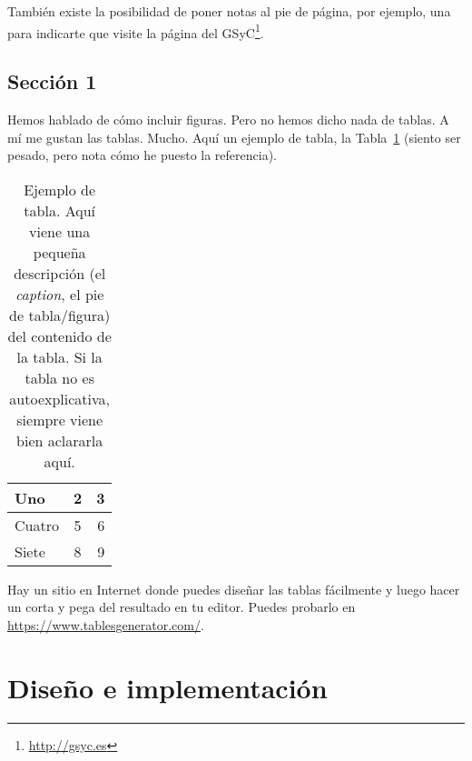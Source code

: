 \documentclass[a4paper, 12pt]{book}
\begin{document}
	También existe la posibilidad de poner notas al pie de página, por ejemplo, una para indicarte que visite la página del GSyC\footnote{\url{http://gsyc.es}}.
	
	
	
	\section{Sección 1} 
	\label{sec:seccion1}
	
	Hemos hablado de cómo incluir figuras.
	Pero no hemos dicho nada de tablas.
	A mí me gustan las tablas.
	Mucho.
	Aquí un ejemplo de tabla, la Tabla~\ref{tab:ejemplo} (siento ser pesado, pero nota cómo he puesto la referencia).
	
	\begin{table}
		\begin{center}
			\begin{tabular}{ | l | c | r |} %
				\hline
				Uno & 2 & 3 \\ \hline %
				Cuatro & 5 & 6 \\ \hline
				Siete & 8 & 9 \\
				\hline
			\end{tabular}
			\caption{Ejemplo de tabla. Aquí viene una pequeña descripción (el \emph{caption}, el pie de tabla/figura) del contenido de la tabla. Si la tabla no es autoexplicativa, siempre viene bien aclararla aquí.}
			\label{tab:ejemplo}
		\end{center}
	\end{table}
	
	Hay un sitio en Internet donde puedes diseñar las tablas fácilmente y luego hacer un corta y pega del resultado en tu editor.
	Puedes probarlo en \url{https://www.tablesgenerator.com/}.
	
	
	
	
	\cleardoublepage
	\chapter{Diseño e implementación}
	\label{sec:diseno}
	
\end{document}
